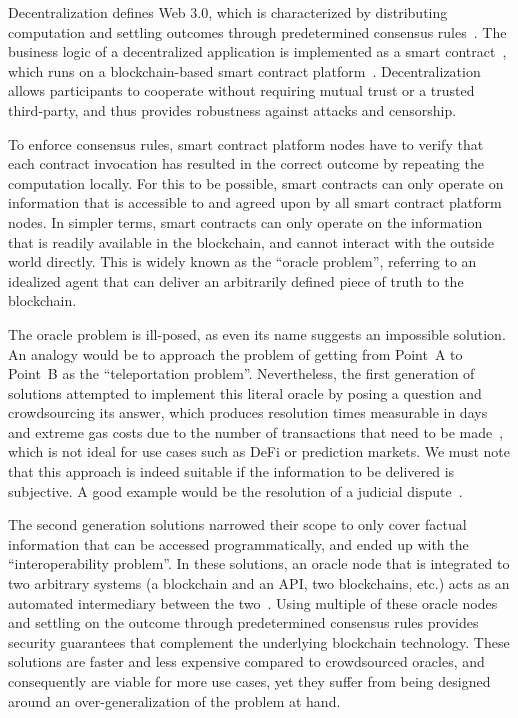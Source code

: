 \documentclass[11pt]{article}
\begin{document}
Decentralization defines Web 3.0, which is characterized by distributing computation and settling outcomes through predetermined consensus rules~\cite{nakamoto:2009}.
The business logic of a decentralized application is implemented as a smart contract~\cite{szabo:1994}, which runs on a blockchain-based smart contract platform~\cite{buterin:2014a}.
Decentralization allows participants to cooperate without requiring mutual trust or a trusted third-party, and thus provides robustness against attacks and censorship.

To enforce consensus rules, smart contract platform nodes have to verify that each contract invocation has resulted in the correct outcome by repeating the computation locally.
For this to be possible, smart contracts can only operate on information that is accessible to and agreed upon by all smart contract platform nodes.
In simpler terms, smart contracts can only operate on the information that is readily available in the blockchain, and cannot interact with the outside world directly.
This is widely known as the ``oracle problem'', referring to an idealized agent that can deliver an arbitrarily defined piece of truth to the blockchain.

The oracle problem is ill-posed, as even its name suggests an impossible solution.
An analogy would be to approach the problem of getting from Point~A to Point~B as the ``teleportation problem''.
Nevertheless, the first generation of solutions attempted to implement this literal oracle by posing a question and crowdsourcing its answer, which produces resolution times measurable in days and extreme gas costs due to the number of transactions that need to be made~\cite{augur:2019}, which is not ideal for use cases such as DeFi or prediction markets.
We must note that this approach is indeed suitable if the information to be delivered is subjective.
A good example would be the resolution of a judicial dispute~\cite{kleros:2019}.

The second generation solutions narrowed their scope to only cover factual information that can be accessed programmatically, and ended up with the ``interoperability problem''.
In these solutions, an oracle node that is integrated to two arbitrary systems (a blockchain and an API, two blockchains, etc.) acts as an automated intermediary between the two~\cite{ellis:2017,band,depedro:2017,tellor}.
Using multiple of these oracle nodes and settling on the outcome through predetermined consensus rules provides security guarantees that complement the underlying blockchain technology.
These solutions are faster and less expensive compared to crowdsourced oracles, and consequently are viable for more use cases, yet they suffer from being designed around an over-generalization of the problem at hand.
\end{document}
